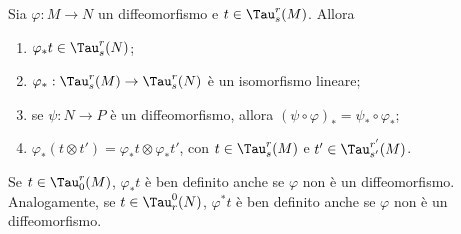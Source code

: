 \begin{proposition}
	Sia $\varphi: M \to N$ un diffeomorfismo e $t\in \Tau_s^r(M)$. Allora
	\begin{enumerate}
		\item $\varphi_*t \in \Tau_s^r(N)$;
		\item $\varphi_* : \Tau_s^r(M) \to \Tau_s^r(N)$ è un isomorfismo lineare;
		\item se $\psi: N \to P$ è un diffeomorfismo, allora $(\psi\circ \varphi)_* = \psi_* \circ \varphi_*$;
		\item $\varphi_*(t\otimes t') = \varphi_* t\otimes \varphi_* t'$, con $t\in \Tau_s^r(M)$ e $t'\in \Tau_{s'}^{r'}(M)$.
	\end{enumerate}
\end{proposition}

\begin{remark}
	Se $t\in\Tau_0^r(M)$, $\varphi_*t$ è ben definito anche se $\varphi$ non è un diffeomorfismo. Analogamente, se $t \in \Tau_r^0(N)$, $\varphi^*t$ è ben definito anche se $\varphi$ non è un diffeomorfismo.
\end{remark}















